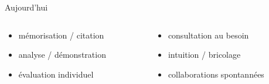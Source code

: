 \begin{frame}{Aujourd'hui}
\begin{columns}
\begin{column}{0.49\linewidth}
		\begin{itemize}
			\item mémorisation / citation
			\item analyse / démonstration
			\item évaluation individuel
		\end{itemize}
	\end{column}
	\begin{column}{0.49\linewidth}
		\begin{itemize}
			\item consultation au besoin
			\item intuition / bricolage
			\item collaborations spontannées
		\end{itemize}
	\end{column}
\end{columns}
\end{frame}
